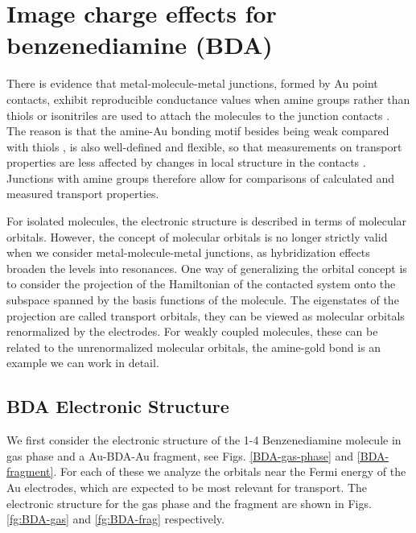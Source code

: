 \documentclass[aip,jcp,a4paper,reprint,floatfix,superscriptaddress]{revtex4-1}
\begin{document}
\section{Image charge effects for benzenediamine (BDA)} \label{Sec:BDA}

There is evidence that metal-molecule-metal junctions, formed by Au point contacts, exhibit reproducible conductance values when amine groups rather than thiols or isonitriles are used to attach the molecules to the junction contacts \cite{Venkataraman2006}. The reason is that the amine-Au bonding motif besides being weak compared with thiols \cite{Hakkinen2012}, is also well-defined and flexible, so that measurements on transport properties are less affected by changes in local structure in the contacts \cite{Quek2007,Venkataraman2007}. Junctions with amine groups therefore allow for comparisons of calculated and measured transport properties.

For isolated molecules, the electronic structure is described in terms of molecular orbitals. However, the concept of molecular orbitals is no longer strictly valid when we consider metal-molecule-metal junctions, as hybridization effects broaden the levels into resonances. One way of generalizing the orbital concept 
is to consider the projection of the Hamiltonian of the contacted system onto the subspace spanned by the basis functions of the molecule. The eigenstates of the projection are called transport orbitals, they can be viewed as molecular orbitals renormalized by the electrodes. For weakly coupled molecules, these can be related to the unrenormalized molecular orbitals, the amine-gold bond is an example we can work in detail.




\subsection{BDA Electronic Structure}\label{BDA electronic_structure}

We first consider the electronic structure of the 1-4 Benzenediamine molecule in gas phase and a Au-BDA-Au fragment, see Figs. \ref{BDA-gas-phase} and \ref{BDA-fragment}. For each of these we analyze the orbitals near the Fermi energy of the Au electrodes, which are expected to be most relevant for transport. The electronic structure for the gas phase and the fragment are shown in Figs. \ref{fg:BDA-gas} and \ref{fg:BDA-frag} respectively.
\end{document}
